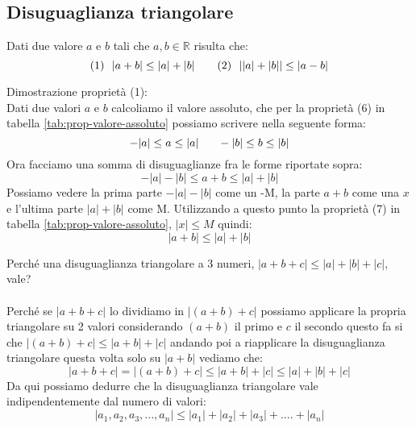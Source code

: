\subsection{Disuguaglianza triangolare}
\begin{definition}
    Dati due valore $a$ e $b$ tali che $a, b \in \mathbb{R}$ risulta che:
    \begin{equation}
        (1)\:\:\:|a + b| \leq |a| + |b| \hspace{.7cm} (2)\:\:\:||a| + |b|| \leq |a - b| 
    \end{equation}
\end{definition}
\begin{demostration}
    Dimostrazione proprietà (1):\\
    Dati due valori $a$ e $b$ calcoliamo il valore assoluto, che per la proprietà (6) in tabella \ref{tab:prop-valore-assoluto}  possiamo scrivere nella seguente forma:
    \begin{equation}
            -|a| \leq a \leq |a| \hspace{.6cm} -|b| \leq b \leq |b|
    \end{equation}
    Ora facciamo una somma di disuguaglianze fra le forme riportate sopra:
    \begin{equation}
        - |a| - |b| \leq a + b \leq |a| + |b|
    \end{equation}
    Possiamo vedere la prima parte $-|a| - |b|$ come un -M, la parte $a + b$ come una $x$ e l'ultima parte $|a| + |b|$ come M. Utilizzando a questo punto la proprietà (7) in tabella \ref{tab:prop-valore-assoluto}, $|x| \leq M$ quindi:
    \begin{equation}
        |a + b| \leq |a| + |b|
    \end{equation}
\end{demostration}
\begin{observation}
Perché una disuguaglianza triangolare a 3 numeri, $|a + b + c| \leq |a| + |b| + |c|$, vale?\\ \\
Perché se $|a + b + c|$ lo dividiamo in $|(a + b) + c|$ possiamo applicare la propria triangolare su 2 valori considerando $(a+b)$ il primo e $c$ il secondo questo fa si che $|(a + b) + c| \leq |a + b| + |c|$ andando poi a riapplicare la disuguaglianza triangolare questa volta solo su $|a + b|$ vediamo che:
\begin{equation}
    |a + b + c| = |(a + b) + c| \leq |a + b| + |c| \leq |a| + |b| + |c|
\end{equation}
Da qui possiamo dedurre che la disuguaglianza triangolare vale indipendentemente dal numero di valori:
\begin{equation}
    |a_1, a_2, a_3, ..., a_n| \leq |a_1| + |a_2| + |a_3| + .... + |a_n|
\end{equation}
\end{observation}
